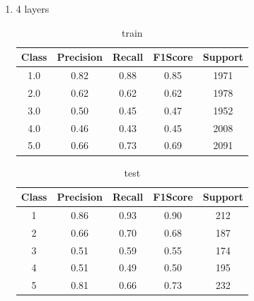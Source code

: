 \begin{enumerate}[label=(\alph*)]
\begin{enumerate}[label=\roman*.]
\begin{table}[!htb]
                        \label{part f test depth 3}
                    \end{table}
              \item 4 layers
                    \begin{table}[!htb]
                        \centering
                        \begin{tabular}{ccccc}
                            \hline
                            Class & Precision & Recall & F1Score & Support \\ \hline
                            1.0   & 0.82      & 0.88   & 0.85    & 1971    \\
                            2.0   & 0.62      & 0.62   & 0.62    & 1978    \\
                            3.0   & 0.50      & 0.45   & 0.47    & 1952    \\
                            4.0   & 0.46      & 0.43   & 0.45    & 2008    \\
                            5.0   & 0.66      & 0.73   & 0.69    & 2091    \\ \hline
                        \end{tabular}
                        \caption{train}
                        \label{part f train depth 4}
                    \end{table}
                    \begin{table}[!htb]
                        \centering
                        \begin{tabular}{ccccc}
                            \hline
                            Class & Precision & Recall & F1Score & Support \\ \hline
                            1     & 0.86      & 0.93   & 0.90    & 212     \\
                            2     & 0.66      & 0.70   & 0.68    & 187     \\
                            3     & 0.51      & 0.59   & 0.55    & 174     \\
                            4     & 0.51      & 0.49   & 0.50    & 195     \\
                            5     & 0.81      & 0.66   & 0.73    & 232     \\ \hline
                        \end{tabular}
                        \caption{test}
                        \label{part f test depth 4}
                    \end{table}
                    \newpage



\end{enumerate}
\end{enumerate}

